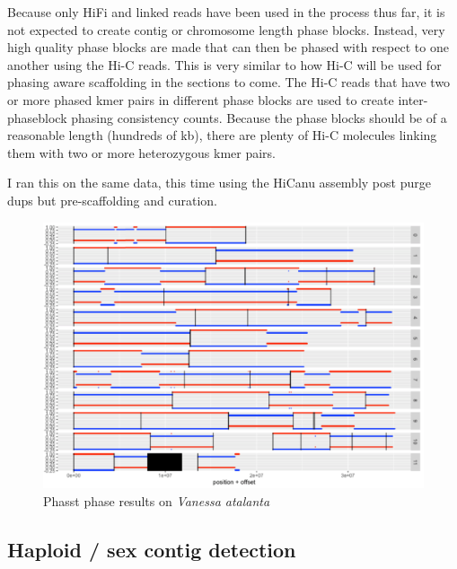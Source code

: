 {\par{
Because only HiFi and linked reads have been used in the process thus far, it is not expected to create contig or chromosome length phase blocks. Instead, very high quality phase blocks are made that  can then be phased with respect to one another using the Hi-C reads. This is very similar to how Hi-C will be used for phasing aware scaffolding in the sections to come. The Hi-C reads that have two or more phased kmer pairs in different phase blocks are used to create inter-phaseblock phasing consistency counts. Because the phase blocks should be of a reasonable length (hundreds of kb), there are plenty of Hi-C molecules linking them with two or more heterozygous kmer pairs.
} 

\par{
I ran this on the same data, this time using the HiCanu assembly post purge dups but pre-scaffolding and curation.
}


\begin{figure}[htbp!]
\caption{Phasst phase results on \textit{Vanessa atalanta}}
\label{figure:phasstphase}
\begin{centering}
\includegraphics[width=\textwidth]{phasstphase.png}
\end{centering}
\end{figure}

\subsection{Haploid / sex contig detection}

}
